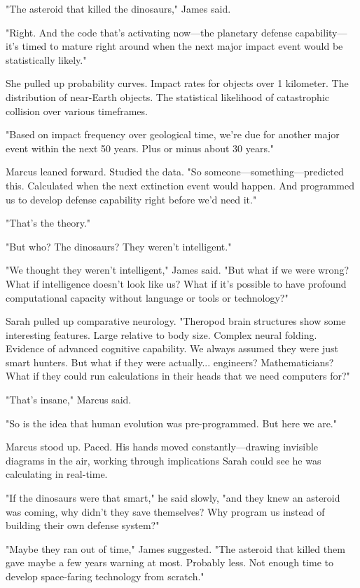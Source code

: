 "The asteroid that killed the dinosaurs," James said.

"Right. And the code that's activating now—the planetary defense capability—it's timed to mature right around when the next major impact event would be statistically likely."

She pulled up probability curves. Impact rates for objects over 1 kilometer. The distribution of near-Earth objects. The statistical likelihood of catastrophic collision over various timeframes.

"Based on impact frequency over geological time, we're due for another major event within the next 50 years. Plus or minus about 30 years."

Marcus leaned forward. Studied the data. "So someone—something—predicted this. Calculated when the next extinction event would happen. And programmed us to develop defense capability right before we'd need it."

"That's the theory."

"But who? The dinosaurs? They weren't intelligent."

"We thought they weren't intelligent," James said. "But what if we were wrong? What if intelligence doesn't look like us? What if it's possible to have profound computational capacity without language or tools or technology?"

Sarah pulled up comparative neurology. "Theropod brain structures show some interesting features. Large relative to body size. Complex neural folding. Evidence of advanced cognitive capability. We always assumed they were just smart hunters. But what if they were actually... engineers? Mathematicians? What if they could run calculations in their heads that we need computers for?"

"That's insane," Marcus said.

"So is the idea that human evolution was pre-programmed. But here we are."

Marcus stood up. Paced. His hands moved constantly—drawing invisible diagrams in the air, working through implications Sarah could see he was calculating in real-time.

"If the dinosaurs were that smart," he said slowly, "and they knew an asteroid was coming, why didn't they save themselves? Why program us instead of building their own defense system?"

"Maybe they ran out of time," James suggested. "The asteroid that killed them gave maybe a few years warning at most. Probably less. Not enough time to develop space-faring technology from scratch."

